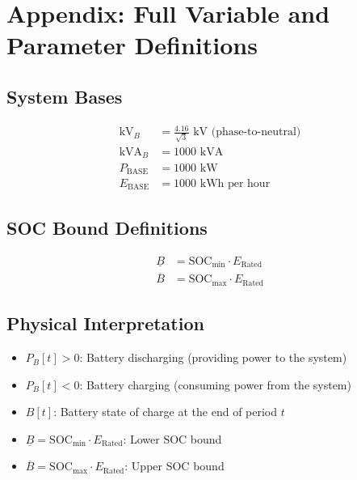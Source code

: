 \documentclass[11pt]{article}
\begin{document}
\section{Appendix: Full Variable and Parameter Definitions}

\subsection{System Bases}
\begin{align}
\text{kV}_B &= \frac{4.16}{\sqrt{3}} \text{ kV (phase-to-neutral)} \\
\text{kVA}_B &= 1000 \text{ kVA} \\
P_{\text{BASE}} &= 1000 \text{ kW} \\
E_{\text{BASE}} &= 1000 \text{ kWh per hour}
\end{align}

\subsection{SOC Bound Definitions}
\begin{align}
\underline{B} &= \text{SOC}_{\min} \cdot E_{\text{Rated}} \\
\overline{B} &= \text{SOC}_{\max} \cdot E_{\text{Rated}}
\end{align}

\subsection{Physical Interpretation}
\begin{itemize}
    \item $P_B[t] > 0$: Battery discharging (providing power to the system)
    \item $P_B[t] < 0$: Battery charging (consuming power from the system)
    \item $B[t]$: Battery state of charge at the end of period $t$
    \item $\underline{B} = \text{SOC}_{\min} \cdot E_{\text{Rated}}$: Lower SOC bound
    \item $\overline{B} = \text{SOC}_{\max} \cdot E_{\text{Rated}}$: Upper SOC bound
\end{itemize}
\end{document}

